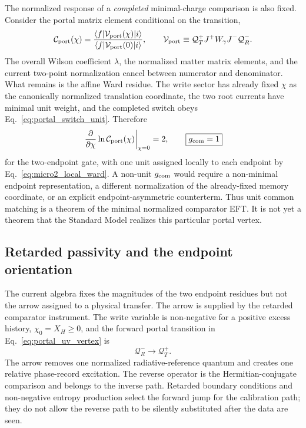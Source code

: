 \documentclass[aps,prd,twocolumn,10pt,superscriptaddress,nofootinbib]{revtex4-2}
\begin{document}
The normalized response of a \emph{completed} minimal-charge comparison is
also fixed.  Consider the portal matrix element conditional on the
transition,
\begin{equation}
 \mathcal C_{\rm port}(\chi)
 =\frac{\langle f|\mathcal V_{\rm port}(\chi)|i\rangle}
        {\langle f|\mathcal V_{\rm port}(0)|i\rangle},
 \qquad
 \mathcal V_{\rm port}\equiv
 \mathcal Q_T^+J^+W_\gamma J^-\mathcal Q_R^- .
 \label{eq:portal_normalized_matrix_element}
\end{equation}
The overall Wilson coefficient $\lambda$, the normalized matter matrix
elements, and the current two-point normalization cancel between numerator
and denominator.  What remains is the affine Ward residue.  The write
sector has already fixed $\chi$ as the canonically normalized translation
coordinate, the two root currents have minimal unit weight, and the
completed switch obeys Eq.~\eqref{eq:portal_switch_unit}.  Therefore
\begin{equation}
 \left.\frac{\partial}{\partial\chi}
 \ln\mathcal C_{\rm port}(\chi)\right|_{\chi=0}=2,
 \qquad
 \boxed{g_{\rm com}=1}
 \label{eq:portal_unit_common_gate}
\end{equation}
for the two-endpoint gate, with one unit assigned locally to each endpoint
by Eq.~\eqref{eq:micro2_local_ward}.  A non-unit $g_{\rm com}$ would require
a non-minimal endpoint representation, a different normalization of the
already-fixed memory coordinate, or an explicit endpoint-asymmetric
counterterm.  Thus unit common matching is a theorem of the minimal
normalized comparator EFT.  It is not yet a theorem that the Standard Model
realizes this particular portal vertex.

\subsection{Retarded passivity and the endpoint orientation}
\label{sec:orientation_complete}

The current algebra fixes the magnitudes of the two endpoint residues but
not the arrow assigned to a physical transfer.  The arrow is supplied by
the retarded comparator instrument.  The write variable is non-negative for
a positive excess history, $\chi_0=X_H\ge0$, and the forward portal
transition in Eq.~\eqref{eq:portal_uv_vertex} is
\begin{equation}
 \mathcal Q_R^-\longrightarrow \mathcal Q_T^+ .
 \label{eq:portal_forward_arrow}
\end{equation}
The arrow removes one normalized radiative-reference quantum and creates one
relative phase-record excitation.
The reverse operator is the Hermitian-conjugate comparison and belongs to
the inverse path.  Retarded boundary conditions and non-negative entropy
production select the forward jump for the calibration path; they do not
allow the reverse path to be silently substituted after the data are seen.
\end{document}

